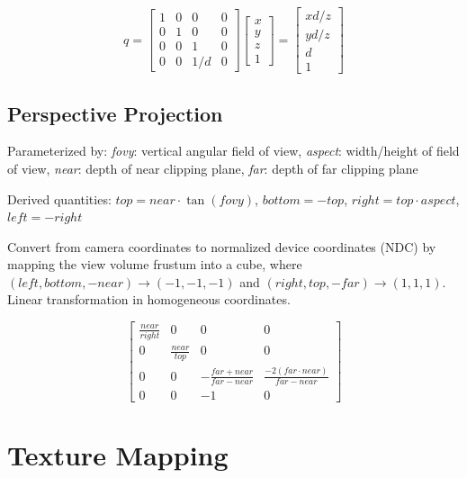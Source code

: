 \documentclass[10pt,landscape]{article}
\begin{document}
\begin{multicols}{3}
$$
q = \begin{bmatrix}
        1 & 0 & 0 & 0 \\
        0 & 1 & 0 & 0 \\
        0 & 0 & 1 & 0 \\
        0 & 0 & 1/d & 0
    \end{bmatrix}
    \begin{bmatrix}
        x \\
        y \\
        z \\
        1
    \end{bmatrix} =
    \begin{bmatrix}
        xd/z \\
        yd/z \\
        d \\
        1
    \end{bmatrix}
$$

\subsection{Perspective Projection}

Parameterized by: \textit{fovy}: vertical angular field of view, \textit{aspect}: width/height of field of view, \textit{near}: depth of near clipping plane, \textit{far}: depth of far clipping plane

Derived quantities: $top = near \cdot \tan(fovy)$, $bottom = -top$, $right = top \cdot aspect$, $left = -right$

Convert from camera coordinates to normalized device coordinates (NDC) by mapping the view volume frustum into a cube, where $(left, bottom, -near) \rightarrow (-1, -1, -1)$ and $(right, top, -far) \rightarrow (1, 1, 1)$. Linear transformation in homogeneous coordinates.

$$\begin{bmatrix}
    \frac{near}{right} & 0 & 0 & 0 \\
    0 & \frac{near}{top} & 0 & 0 \\
    0 & 0 & -\frac{far+near}{far-near} & \frac{-2(far\cdot near)}{far-near}\\
    0 & 0 & -1 & 0
\end{bmatrix}$$


\section{Texture Mapping}


\end{multicols}
\end{document}
